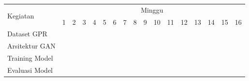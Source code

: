 \newcommand{\w}{\cellcolor{white}}
\newcommand{\G}{\cellcolor{gray}}
\begin{table}[H]
  \label{tbl:timeline}
  \begin{tabular}{|p{3.5cm}|c|c|c|c|c|c|c|c|c|c|c|c|c|c|c|c|}

    \hline
    \multirow{2}{*}{Kegiatan} & \multicolumn{16}{|c|}{Minggu}                                                                       \\
    \cline{2-17}              &
    1                         & 2                             & 3  & 4  & 5  & 6  & 7  & 8  & 9  & 10 & 11 & 12 & 13 & 14 & 15 & 16 \\
    \hline

    Dataset GPR          &
    \G                        & \G                            & \G & \G & \w & \w & \w & \w & \w & \w & \w & \w & \w & \w & \w & \w \\
    \hline

    Arsitektur GAN           &
    \w                        & \w                            & \w & \w & \G & \G & \G & \G & \w & \w & \w & \w & \w & \w & \w & \w \\
    \hline

    Training Model              &
    \w                        & \w                            & \w & \w & \w & \w & \w & \w & \G & \G & \G & \G & \w & \w & \w & \w \\
    \hline

    Evaluasi Model       &
    \w                        & \w                            & \w & \w & \w & \w & \w & \w & \w & \w & \w & \w & \G & \G & \G & \G \\
    \hline
  \end{tabular}
\end{table}